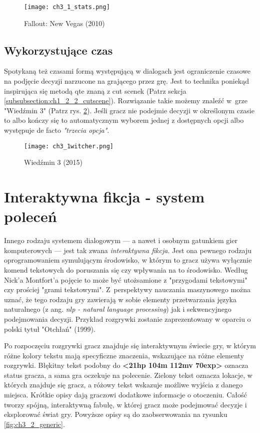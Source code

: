 \begin{figure}[h]
    \texttt{[image: ch3\_1\_stats.png]}
    \caption{Fallout: New Vegas (2010)}
    \centering
    \label{fig:ch3_1_stats}
\end{figure}

\newpage

\subsection{Wykorzystujące czas}

Spotykaną też czasami formą występującą w dialogach jest ograniczenie czasowe na podjęcie decyzji
narzucone na grającego przez grę. Jest to technika poniekąd inspirująca się metodą \gls{qte} znaną z
cut scenek (Patrz sekcja \ref{subsubsection:ch1_2_2_cutscene}). Rozwiązanie takie możemy znaleźć
w~grze "Wiedźmin 3" (Patrz rys. \ref{fig:ch3_1_time}). Jeśli gracz nie podejmie decyzji w
określonym czasie to albo kończy się to automatycznym wyborem jednej z dostępnych opcji albo
występuje de facto \textit{"trzecia opcja"}.

\begin{figure}[h]
    \texttt{[image: ch3\_1witcher.png]}
    \caption{Wiedźmin 3 (2015)}
    \centering
    \label{fig:ch3_1_time}
\end{figure}

\section{Interaktywna fikcja - system poleceń}\label{subsection:ch3_2}

Innego rodzaju systemem dialogowym --- a nawet i osobnym gatunkiem gier komputerowych --- jest
tak zwana \textit{interaktywna fikcja}. Jest ona pewnego rodzaju oprogramowaniem symulującym
środowisko, w którym to gracz używa wyłącznie komend tekstowych do poruszania się czy wpływania
na to środowisko\cite{if_wiki}. Według Nick'a Montfort'a pojęcie to może być utożsamione z
"przygodami tekstowymi" czy prościej "grami tekstowymi"\cite{IF_4th_era}. Z~perspektywy nauczania
maszynowego można uznać, że tego rodzaju gry zawierają w sobie elementy przetwarzania języka
naturalnego (z ang. \textit{\gls{nlp} - natural language processing}) jak i sekwencyjnego podejmowania
decyzji\cite{hausknecht2020interactive}. Przykład rozgrywki zostanie zaprezentowany w oparciu
o polski tytuł "Otchłań" (1999).

Po rozpoczęciu rozgrywki gracz znajduje się interaktywnym świecie gry, w którym różne kolory tekstu
mają specyficzne znaczenia, wskazujące na różne elementy rozgrywki. Błękitny tekst podobny do
\textbf{<21hp 104m 112mv 70exp>} oznacza status gracza, a sama gra oczekuje na polecenie.
Zielony tekst oznacza lokacje, w których znajduje się gracz, a różowy tekst wskazuje możliwe
wyjścia z danego miejsca. Krótkie opisy dają graczowi dodatkowe informacje o otoczeniu. Całość
tworzy spójną, interaktywną fabułę, w której gracz może podejmować decyzje i eksplorować świat gry.
Powyższe opisy są do zaobserwowania na rysunku \ref{fig:ch3_2_generic}.

